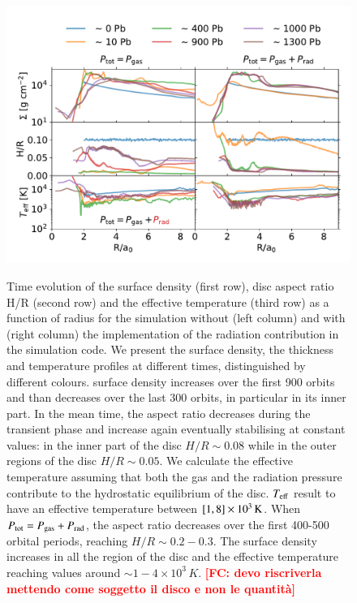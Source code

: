 \documentclass{aa}
\newcommand{\fc}[1]{\textcolor{red}{\bf [FC: #1]}}
\begin{document}
\begin{figure}[h]
    \begin{center}
    \includegraphics[width=1.8\columnwidth ]{Fig/Results/e0q1_hr01_md001all_Sigma_hr_Teff_prad.pdf} \\
    \caption{Time evolution of the surface density (first row), disc aspect ratio H/R (second row) and the effective temperature (third row) as a function of radius for the simulation without (left column) and with (right column) the implementation of the radiation contribution in the simulation code. We present the surface density, the thickness and temperature profiles at different times, distinguished by different colours. 
    surface density increases over the first 900 orbits and than decreases over the last 300 orbits, in particular in its inner part. In the mean time, the aspect ratio decreases during the transient phase and increase again eventually stabilising at constant values: in the inner part of the disc $H/R \sim 0.08$ while in the outer regions of the disc $H/R \sim 0.05$. We calculate the effective temperature assuming that both the gas and the radiation pressure contribute to the hydrostatic equilibrium of the disc. $T_{\rm eff}$  result to have an effective temperature between $[1,8]\times 10^{3} \, \rm K$.
    When $P_{\rm tot}=P_{\rm gas}+P_{\rm rad}$, the aspect ratio decreases over the first 400-500 orbital periods, reaching $H/R \sim 0.2-0.3$. The surface density increases in all the region of the disc and the effective temperature reaching values around $\sim 1-4 \times 10^3 \, K$. \fc{devo riscriverla mettendo come soggetto il disco e non le quantità}}
    \label{fig:hr_teff}  
    \end{center}
\end{figure}
\end{document}
